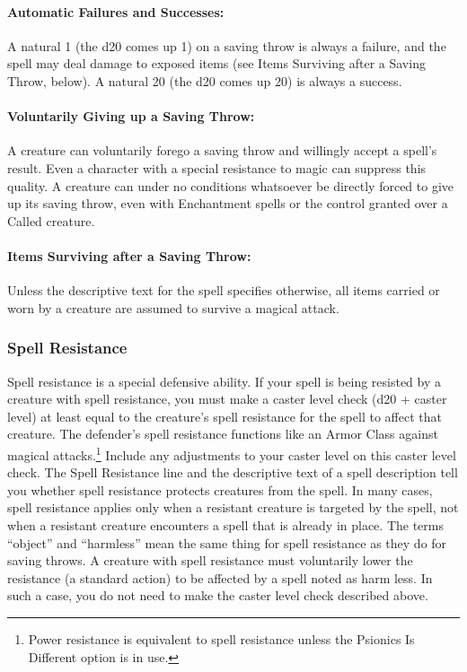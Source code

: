 \documentclass[../VancianToPsionics.tex]{subfiles}
\begin{document}
\paragraph{Automatic Failures and Successes:} A natural 1 (the d20 comes up 1) on a saving throw is always a failure, and the spell may deal damage to exposed items (see Items Surviving after a Saving Throw, below). A natural 20 (the d20 comes up 20) is always a success.

\paragraph{Voluntarily Giving up a Saving Throw:} A creature can voluntarily forego a saving throw and willingly accept a spell's result. Even a character with a special resistance to magic can suppress this quality.
A creature  can under no conditions whatsoever be directly forced to give up its saving throw, even with Enchantment spells or the control granted over a Called creature.

\paragraph{Items Surviving after a Saving Throw:} Unless the descriptive text for the spell specifies otherwise, all items carried or worn by a creature are assumed to survive a magical attack.

\subsubsection{Spell Resistance}
Spell resistance is a special defensive ability. If your spell is being resisted by a creature with spell resistance, you must make a caster level check (d20 + caster level) at least equal to the creature's spell resistance for the spell to affect that creature. The defender's spell resistance functions like an Armor Class against magical attacks.\footnote{Power resistance is equivalent to spell resistance unless the Psionics Is Different option is in use.} Include any adjustments to your caster level on this caster level check.
The Spell Resistance line and the descriptive text of a spell description tell you whether spell resistance protects creatures from the spell. In many cases, spell resistance applies only when a resistant creature is targeted by the spell, not when a resistant creature encounters a spell that is already in place.
The terms “object” and “harmless” mean the same thing for spell resistance as they do for saving throws. A creature with spell resistance must voluntarily lower the resistance (a standard action) to be affected by a spell noted as harm less. In such a case, you do not need to make the caster level check described above.
\end{document}
